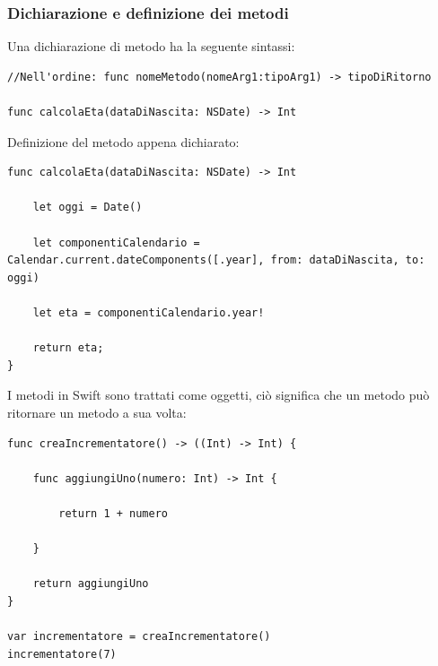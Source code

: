 \subsubsection{Dichiarazione e definizione dei metodi}
Una dichiarazione di metodo ha la seguente sintassi: 
\lstset{language=[Objective]C, breakindent=40pt, breaklines}
\begin{lstlisting}
//Nell'ordine: func nomeMetodo(nomeArg1:tipoArg1) -> tipoDiRitorno

func calcolaEta(dataDiNascita: NSDate) -> Int

\end{lstlisting}
\newpage
Definizione del metodo appena dichiarato: 
\lstset{language=[Objective]C, breakindent=40pt, breaklines}
\begin{lstlisting}
func calcolaEta(dataDiNascita: NSDate) -> Int

	let oggi = Date()
      
    let componentiCalendario = Calendar.current.dateComponents([.year], from: dataDiNascita, to: oggi)                             			
	
	let eta = componentiCalendario.year!
	
	return eta;
}
\end{lstlisting}
I metodi in Swift sono trattati come oggetti, ciò significa che un metodo può ritornare un metodo a sua volta: 
\lstset{language=[Objective]C, breakindent=40pt, breaklines}
\begin{lstlisting}
func creaIncrementatore() -> ((Int) -> Int) {
	
	func aggiungiUno(numero: Int) -> Int {
	
		return 1 + numero 
	
	}
	
	return aggiungiUno
}

var incrementatore = creaIncrementatore()
incrementatore(7)
\end{lstlisting}
